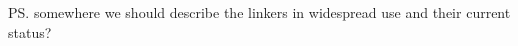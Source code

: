 
\ps{somewhere we should describe the linkers in widespread use and
  their current status?}

% 
% 
% 
% 
% 


